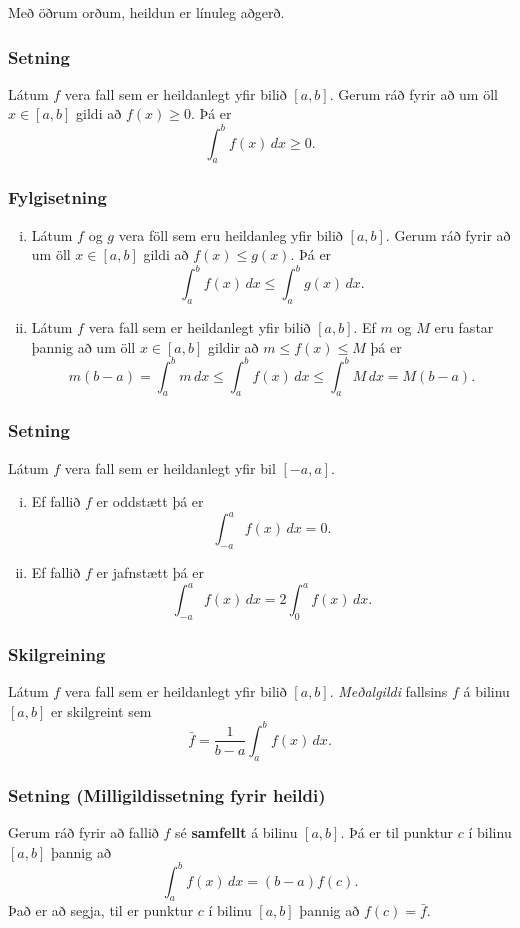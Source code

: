 \documentclass[icelandic,a4paper,12pt]{article}
\begin{document}
Með öðrum orðum, heildun er línuleg aðgerð.

\subsubsection{Setning}
Látum $f$ vera fall sem er heildanlegt yfir bilið $[a, b]$.
Gerum ráð fyrir að um öll $x\in [a, b]$ gildi að $f(x)\geq 0$. 
Þá er 
$$
\int_a^b f(x)\,dx\geq 0.
$$

\subsubsection{Fylgisetning}  
\begin{enumerate}[(i)]
\item Látum $f$ og $g$ vera föll sem eru heildanleg yfir bilið $[a, b]$.
Gerum ráð fyrir að um öll $x\in [a, b]$ gildi að $f(x)\leq g(x)$.  Þá  er
$$\int_a^b f(x)\,dx\leq \int_a^b g(x)\,dx.$$
\item Látum $f$ vera fall sem er heildanlegt yfir bilið $[a, b]$. 
Ef $m$ og $M$ eru fastar þannig að um öll $x\in [a, b]$ gildir að $m\leq f(x)\leq M$  
þá er 
$$
m(b-a)= \int_a^b m\,dx \leq  \int_a^b f(x)\,dx \leq \int_a^b M\,dx =M(b-a).
$$
\end{enumerate}

\subsubsection{Setning}  
Látum $f$ vera fall sem er heildanlegt yfir bil $[-a, a]$.
\begin{enumerate}[(i)]
\item Ef fallið $f$ er oddstætt þá er 
$$\int_{-a}^a f(x)\,dx=0.$$
\item Ef fallið $f$ er jafnstætt þá er 
$$\int_{-a}^a f(x)\,dx=2\int_0^a f(x)\,dx.$$
\end{enumerate}

\subsubsection{Skilgreining}
Látum $f$ vera fall sem er heildanlegt yfir bilið $[a, b]$. 
 \emph{Meðalgildi} fallsins $f$ á bilinu $[a, b]$ er skilgreint sem 
$$\bar{f}=\frac{1}{b-a}\int_{a}^b f(x)\,dx.$$

\subsubsection{Setning (Milligildissetning fyrir heildi)}
Gerum ráð fyrir að fallið $f$ sé {\bf samfellt} á bilinu $[a, b]$.  
Þá er til punktur $c$ í bilinu $[a, b]$ þannig að 
$$\int_a^b f(x)\,dx=(b-a)f(c).$$
Það er að segja, til er punktur $c$ í bilinu $[a, b]$ þannig að
$f(c)=\bar{f}$. 
\end{document}
